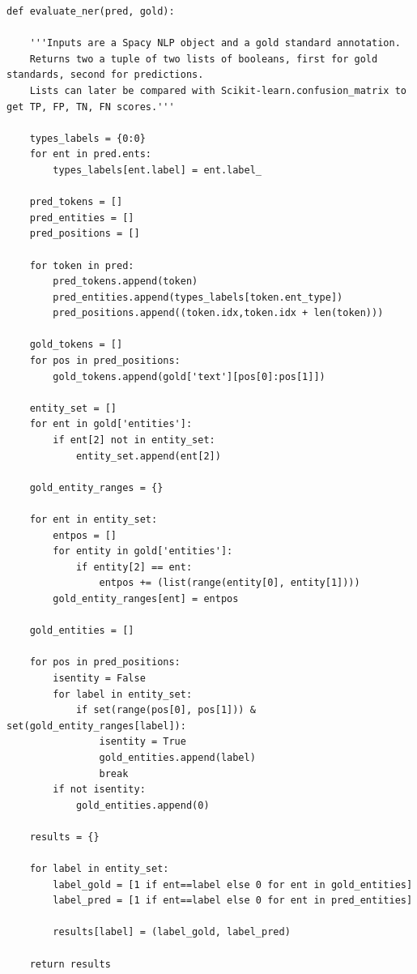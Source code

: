 \documentclass[a4paper,twoside,12pt]{article}
\begin{document}
\begin{verbatim}
def evaluate_ner(pred, gold):
    
    '''Inputs are a Spacy NLP object and a gold standard annotation.
    Returns two a tuple of two lists of booleans, first for gold standards, second for predictions.
    Lists can later be compared with Scikit-learn.confusion_matrix to get TP, FP, TN, FN scores.'''
    
    types_labels = {0:0}
    for ent in pred.ents:
        types_labels[ent.label] = ent.label_
        
    pred_tokens = []
    pred_entities = []
    pred_positions = []
    
    for token in pred:
        pred_tokens.append(token)
        pred_entities.append(types_labels[token.ent_type])
        pred_positions.append((token.idx,token.idx + len(token)))
        
    gold_tokens = []  
    for pos in pred_positions:
        gold_tokens.append(gold['text'][pos[0]:pos[1]])
    
    entity_set = []
    for ent in gold['entities']:
        if ent[2] not in entity_set:
            entity_set.append(ent[2])
     
    gold_entity_ranges = {}
    
    for ent in entity_set:
        entpos = []
        for entity in gold['entities']:
            if entity[2] == ent:
                entpos += (list(range(entity[0], entity[1])))
        gold_entity_ranges[ent] = entpos
            
    gold_entities = []
    
    for pos in pred_positions:
        isentity = False
        for label in entity_set:
            if set(range(pos[0], pos[1])) & set(gold_entity_ranges[label]):
                isentity = True
                gold_entities.append(label)
                break
        if not isentity:
            gold_entities.append(0)
    
    results = {}
    
    for label in entity_set:
        label_gold = [1 if ent==label else 0 for ent in gold_entities]
        label_pred = [1 if ent==label else 0 for ent in pred_entities]
        
        results[label] = (label_gold, label_pred)
        
    return results





\end{verbatim}
\end{document}
